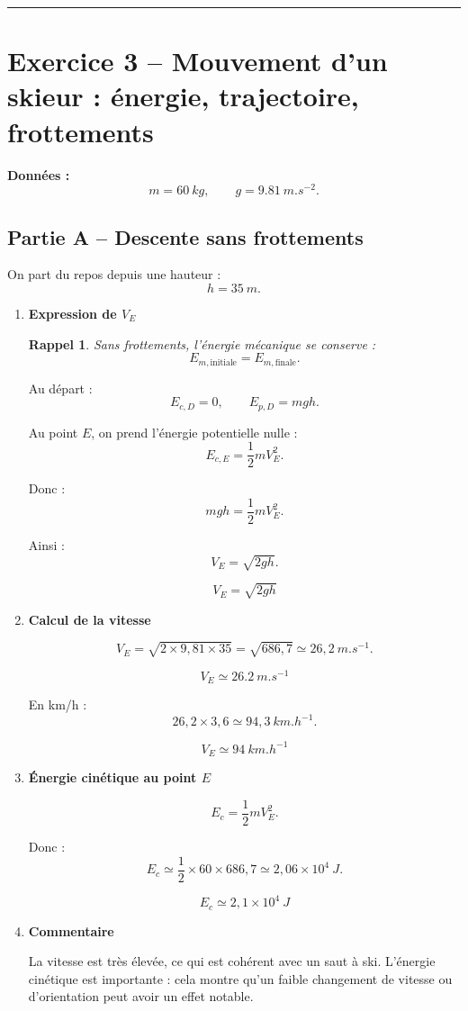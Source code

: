 \documentclass[11pt,a4paper]{article}
\newtheorem*{rappel}{Rappel}
\begin{document}
\vspace{0.6em}
\hrule
\vspace{0.6em}

\section*{Exercice 3 -- Mouvement d’un skieur : énergie, trajectoire, frottements}

\noindent\textbf{Données :}
\[
m=\SI{60}{kg},
\qquad
g=\SI{9,81}{m.s^{-2}}.
\]

\subsection*{Partie A -- Descente sans frottements}

On part du repos depuis une hauteur :
\[
h=\SI{35}{m}.
\]

\begin{enumerate}[label=\textbf{3.\arabic*}, leftmargin=1.6em]

\item \textbf{Expression de \(V_E\)}

\begin{rappel}
Sans frottements, l’énergie mécanique se conserve :
\[
E_{m,\text{initiale}}=E_{m,\text{finale}}.
\]
\end{rappel}

Au départ :
\[
E_{c,D}=0,
\qquad
E_{p,D}=mgh.
\]

Au point \(E\), on prend l’énergie potentielle nulle :
\[
E_{c,E}=\frac12 mV_E^2.
\]

Donc :
\[
mgh=\frac12 mV_E^2.
\]

Ainsi :
\[
V_E=\sqrt{2gh}.
\]

\[
\boxed{V_E=\sqrt{2gh}}
\]

\item \textbf{Calcul de la vitesse}

\[
V_E=\sqrt{2\times 9{,}81\times 35}
=\sqrt{686{,}7}
\simeq 26{,}2\ \si{m.s^{-1}}.
\]

\[
\boxed{V_E\simeq \SI{26,2}{m.s^{-1}}}
\]

En km/h :
\[
26{,}2\times 3{,}6\simeq 94{,}3\ \si{km.h^{-1}}.
\]

\[
\boxed{V_E\simeq \SI{94}{km.h^{-1}}}
\]

\item \textbf{Énergie cinétique au point \(E\)}

\[
E_c=\frac12 mV_E^2.
\]

Donc :
\[
E_c\simeq \frac12\times 60\times 686{,}7
\simeq 2{,}06\times 10^4\ \si{J}.
\]

\[
\boxed{E_c\simeq 2{,}1\times 10^4\ \si{J}}
\]

\item \textbf{Commentaire}

La vitesse est très élevée, ce qui est cohérent avec un saut à ski.  
L’énergie cinétique est importante : cela montre qu’un faible changement de vitesse ou d’orientation peut avoir un effet notable.

\end{enumerate}
\end{document}
